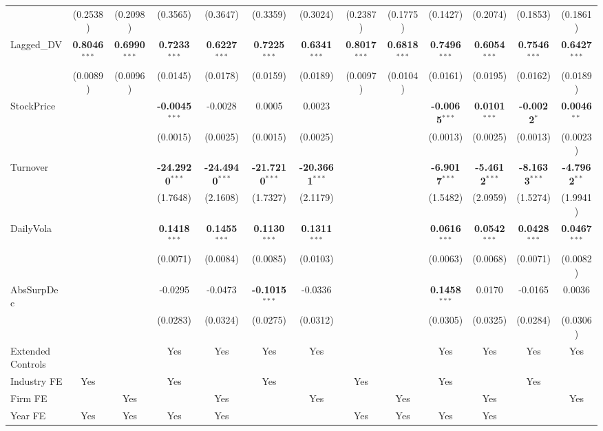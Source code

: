 \begin{landscape}
\begin{table}[H]
\begin{tabular}{lcccccccccccc}
 & (0.2538) & (0.2098) & (0.3565) & (0.3647) & (0.3359) & (0.3024) & (0.2387) & (0.1775) & (0.1427) & (0.2074) & (0.1853) & (0.1861) \\
Lagged\_DV & \textbf{0.8046}$^{***}$ & \textbf{0.6990}$^{***}$ & \textbf{0.7233}$^{***}$ & \textbf{0.6227}$^{***}$ & \textbf{0.7225}$^{***}$ & \textbf{0.6341}$^{***}$ & \textbf{0.8017}$^{***}$ & \textbf{0.6818}$^{***}$ & \textbf{0.7496}$^{***}$ & \textbf{0.6054}$^{***}$ & \textbf{0.7546}$^{***}$ & \textbf{0.6427}$^{***}$ \\
 & (0.0089) & (0.0096) & (0.0145) & (0.0178) & (0.0159) & (0.0189) & (0.0097) & (0.0104) & (0.0161) & (0.0195) & (0.0162) & (0.0189) \\
StockPrice &  &  & \textbf{-0.0045}$^{***}$ & -0.0028 & 0.0005 & 0.0023 &  &  & \textbf{-0.0065}$^{***}$ & \textbf{0.0101}$^{***}$ & \textbf{-0.0022}$^{*}$ & \textbf{0.0046}$^{**}$ \\
 &  &  & (0.0015) & (0.0025) & (0.0015) & (0.0025) &  &  & (0.0013) & (0.0025) & (0.0013) & (0.0023) \\
Turnover &  &  & \textbf{-24.2920}$^{***}$ & \textbf{-24.4940}$^{***}$ & \textbf{-21.7210}$^{***}$ & \textbf{-20.3661}$^{***}$ &  &  & \textbf{-6.9017}$^{***}$ & \textbf{-5.4612}$^{***}$ & \textbf{-8.1633}$^{***}$ & \textbf{-4.7962}$^{**}$ \\
 &  &  & (1.7648) & (2.1608) & (1.7327) & (2.1179) &  &  & (1.5482) & (2.0959) & (1.5274) & (1.9941) \\
DailyVola &  &  & \textbf{0.1418}$^{***}$ & \textbf{0.1455}$^{***}$ & \textbf{0.1130}$^{***}$ & \textbf{0.1311}$^{***}$ &  &  & \textbf{0.0616}$^{***}$ & \textbf{0.0542}$^{***}$ & \textbf{0.0428}$^{***}$ & \textbf{0.0467}$^{***}$ \\
 &  &  & (0.0071) & (0.0084) & (0.0085) & (0.0103) &  &  & (0.0063) & (0.0068) & (0.0071) & (0.0082) \\
AbsSurpDec &  &  & -0.0295 & -0.0473 & \textbf{-0.1015}$^{***}$ & -0.0336 &  &  & \textbf{0.1458}$^{***}$ & 0.0170 & -0.0165 & 0.0036 \\
 &  &  & (0.0283) & (0.0324) & (0.0275) & (0.0312) &  &  & (0.0305) & (0.0325) & (0.0284) & (0.0306) \\
\midrule
Extended Controls &  &  & Yes & Yes & Yes & Yes &  &  & Yes & Yes & Yes & Yes \\
Industry FE & Yes &  & Yes &  & Yes &  & Yes &  & Yes &  & Yes &  \\
Firm FE &  & Yes &  & Yes &  & Yes &  & Yes &  & Yes &  & Yes \\
Year FE & Yes & Yes & Yes & Yes &  &  & Yes & Yes & Yes & Yes &  &  \\

\end{tabular}
\end{table}
\end{landscape}
